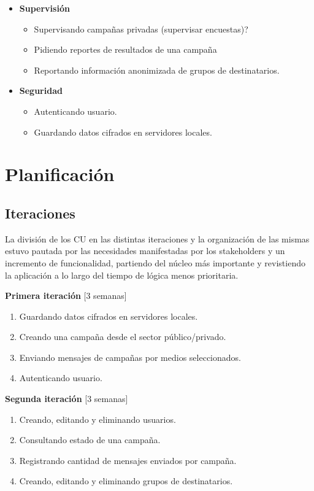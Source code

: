 \documentclass[a4paper, 10pt, twoside]{article}
\begin{document}
\begin{itemize}
\item \textbf{Supervisión}
\begin{itemize}
\item Supervisando campañas privadas (supervisar encuestas)?
\item Pidiendo reportes de resultados de una campaña
\item Reportando información anonimizada de grupos de destinatarios.
\end{itemize}

\item \textbf{Seguridad}
\begin{itemize}
\item Autenticando usuario.
\item Guardando datos cifrados en servidores locales.
\end{itemize}
\end{itemize}

\newpage


\section{Planificación}

\subsection{Iteraciones}
La división de los CU en las distintas iteraciones y la organización de las mismas estuvo pautada por las necesidades manifestadas por los stakeholders y un incremento de funcionalidad, partiendo del núcleo más importante y revistiendo la aplicación a lo largo del tiempo de lógica menos prioritaria.

\textbf{Primera iteración} [3 semanas]
\begin{enumerate}
\item Guardando datos cifrados en servidores locales.
\item Creando una campaña desde el sector público/privado.
\item Enviando mensajes de campañas por medios seleccionados.
\item Autenticando usuario.
\end{enumerate}

\textbf{Segunda iteración} [3 semanas]
\begin{enumerate}
\item Creando, editando y eliminando usuarios.
\item Consultando estado de una campaña.
\item Registrando cantidad de mensajes enviados por campaña.
\item Creando, editando y eliminando grupos de destinatarios.
\end{enumerate}
\end{document}
